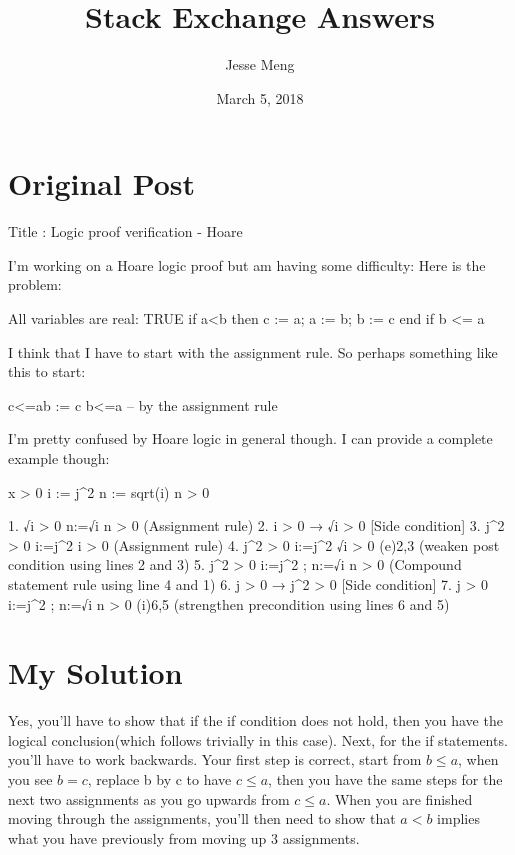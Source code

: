 \documentclass{article}
\title{Stack Exchange Answers}
\author{Jesse Meng }
\date{March 5, 2018}
\begin{document}
\maketitle

\section{Original Post}
Title : Logic proof verification - Hoare

I'm working on a Hoare logic proof but am having some difficulty:  Here is the problem:

    All variables are real:
    {TRUE}
        if a<b then
        c := a;
        a := b;
        b := c
    end if
    	{b <= a}


I think that I have to start with the assignment rule.  So perhaps something like this to start:

    {c<=a}b := c {b<=a} -- by the assignment rule

I'm pretty confused by Hoare logic in general though.  I can provide a complete example though:

        {x > 0}
         i := j^2
         n := sqrt(i)
        {n > 0}
   
        1. { √i > 0} n:=√i {n > 0} (Assignment rule)
        2. i > 0 →  √i > 0 [Side condition]
        3. {j^2 > 0} i:=j^2 {i > 0} (Assignment rule)
        4. {j^2 > 0} i:=j^2 {√i > 0} (e)2,3 (weaken post condition using lines 2 and 3)
        5. {j^2 > 0} i:=j^2 ; n:=√i {n > 0} (Compound statement rule using line 4 and 1)
        6. j > 0 → j^2 > 0 [Side condition]
        7. {j > 0} i:=j^2 ; n:=√i {n > 0} (i)6,5 (strengthen precondition using lines 6 and 5)
\section{My Solution}
Yes, you'll have to show that if the if condition does not hold, then you have the logical conclusion(which follows trivially in this case).
Next, for the if statements. you'll have to work backwards. Your first step is correct, start from $ b\leq a  $, when you see $b=c$, replace b by c to have $ c\leq a  $, then you have the same steps for the next two assignments as you go upwards from $ c\leq a  $. When you are finished moving through the assignments, you'll then need to show that $a<b$ implies what you have previously from moving up $3$ assignments.
\end{document}
